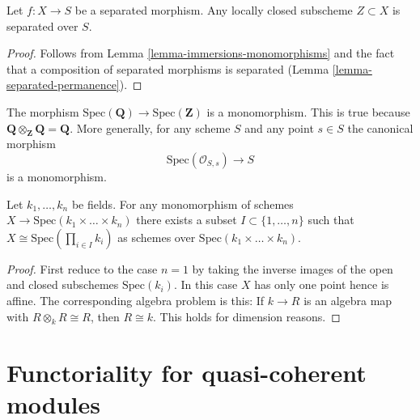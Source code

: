 \begin{lemma}
\label{lemma-subscheme-of-separated-scheme}
Let $f : X \to S$ be a separated morphism.
Any locally closed subscheme $Z \subset X$ is separated over $S$.
\end{lemma}

\begin{proof}
Follows from Lemma \ref{lemma-immersions-monomorphisms}
and the fact that a composition of separated morphisms is separated
(Lemma \ref{lemma-separated-permanence}).
\end{proof}

\begin{example}
\label{example-Q-over-Z}
The morphism $\text{Spec}(\mathbf{Q}) \to \text{Spec}(\mathbf{Z})$
is a monomorphism. This is true because
$\mathbf{Q} \otimes_{\mathbf{Z}} \mathbf{Q} = \mathbf{Q}$.
More generally, for any scheme $S$ and any point $s \in S$ the
canonical morphism
$$
\text{Spec}(\mathcal{O}_{S, s}) \longrightarrow S
$$
is a monomorphism.
\end{example}

\begin{lemma}
\label{lemma-mono-towards-spec-field}
Let $k_1, \ldots, k_n$ be fields.
For any monomorphism of schemes
$X \to \text{Spec}(k_1 \times \ldots \times k_n)$
there exists a subset $I \subset \{1, \ldots, n\}$ such
that $X \cong \text{Spec}(\prod_{i \in I} k_i)$ as
schemes over $\text{Spec}(k_1 \times \ldots \times k_n)$.
\end{lemma}

\begin{proof}
First reduce to the case $n = 1$ by taking the inverse images of the
open and closed subschemes $\text{Spec}(k_i)$.
In this case $X$ has only one point hence is affine.
The corresponding algebra problem is this:
If $k \to R$ is an algebra map
with $R \otimes_k R \cong R$, then $R \cong k$.
This holds for dimension reasons.
\end{proof}










\section{Functoriality for quasi-coherent modules}
\label{section-quasi-coherent}

